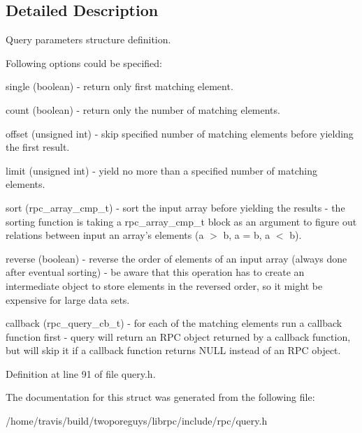 \subsection{Detailed Description}
Query parameters structure definition.

Following options could be specified\-:
\begin{DoxyItemize}
\item single (boolean) -\/ return only first matching element.
\item count (boolean) -\/ return only the number of matching elements.
\item offset (unsigned int) -\/ skip specified number of matching elements before yielding the first result.
\item limit (unsigned int) -\/ yield no more than a specified number of matching elements.
\item sort (rpc\-\_\-array\-\_\-cmp\-\_\-t) -\/ sort the input array before yielding the results -\/ the sorting function is taking a rpc\-\_\-array\-\_\-cmp\-\_\-t block as an argument to figure out relations between input an array's elements (a $>$ b, a = b, a $<$ b).
\item reverse (boolean) -\/ reverse the order of elements of an input array (always done after eventual sorting) -\/ be aware that this operation has to create an intermediate object to store elements in the reversed order, so it might be expensive for large data sets.
\item callback (rpc\-\_\-query\-\_\-cb\-\_\-t) -\/ for each of the matching elements run a callback function first -\/ query will return an R\-P\-C object returned by a callback function, but will skip it if a callback function returns N\-U\-L\-L instead of an R\-P\-C object. 
\end{DoxyItemize}

Definition at line 91 of file query.\-h.



The documentation for this struct was generated from the following file\-:\begin{DoxyCompactItemize}
\item 
/home/travis/build/twoporeguys/librpc/include/rpc/query.\-h\end{DoxyCompactItemize}
